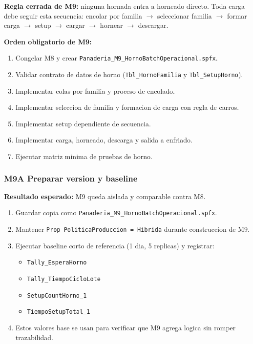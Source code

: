\documentclass[11pt]{article}
\newcommand{\simio}[1]{\texttt{#1}}
\newcommand{\tabla}[1]{\texttt{#1}}
\newcommand{\state}[1]{\texttt{#1}}
\begin{document}
\textbf{Regla cerrada de M9:} ninguna hornada entra a horneado directo. Toda carga debe seguir esta secuencia: encolar por familia \(\rightarrow\) seleccionar familia \(\rightarrow\) formar carga \(\rightarrow\) setup \(\rightarrow\) cargar \(\rightarrow\) hornear \(\rightarrow\) descargar.

\textbf{Orden obligatorio de M9:}
\begin{enumerate}
  \item Congelar M8 y crear \simio{Panaderia\_M9\_HornoBatchOperacional.spfx}.
  \item Validar contrato de datos de horno (\tabla{Tbl\_HornoFamilia} y \tabla{Tbl\_SetupHorno}).
  \item Implementar colas por familia y proceso de encolado.
  \item Implementar seleccion de familia y formacion de carga con regla de carros.
  \item Implementar setup dependiente de secuencia.
  \item Implementar carga, horneado, descarga y salida a enfriado.
  \item Ejecutar matriz minima de pruebas de horno.
\end{enumerate}

\subsubsection{M9A Preparar version y baseline}
\textbf{Resultado esperado:} M9 queda aislada y comparable contra M8.

\begin{enumerate}
  \item Guardar copia como \simio{Panaderia\_M9\_HornoBatchOperacional.spfx}.
  \item Mantener \state{Prop\_PoliticaProduccion = Hibrida} durante construccion de M9.
  \item Ejecutar baseline corto de referencia (1 dia, 5 replicas) y registrar:
  \begin{itemize}
    \item \simio{Tally\_EsperaHorno}
    \item \simio{Tally\_TiempoCicloLote}
    \item \state{SetupCountHorno\_1}
    \item \state{TiempoSetupTotal\_1}
  \end{itemize}
  \item Estos valores base se usan para verificar que M9 agrega logica sin romper trazabilidad.
\end{enumerate}
\end{document}
